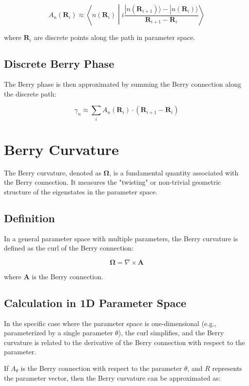 \documentclass{article}
\begin{document}
$$
A_n(\mathbf{R}_i) \approx \left\langle n(\mathbf{R}_i) \middle| i \frac{|n(\mathbf{R}_{i+1})\rangle - |n(\mathbf{R}_i)\rangle}{\mathbf{R}_{i+1} - \mathbf{R}_i} \right\rangle
$$

where $\mathbf{R}_i$ are discrete points along the path in parameter space.

\subsection{Discrete Berry Phase}

The Berry phase is then approximated by summing the Berry connection along the discrete path:

$$
\gamma_n \approx \sum_i A_n(\mathbf{R}_i) \cdot (\mathbf{R}_{i+1} - \mathbf{R}_i)
$$

\section{Berry Curvature}

The Berry curvature, denoted as $\mathbf{\Omega}$, is a fundamental quantity associated with the Berry connection. It measures the "twisting" or non-trivial geometric structure of the eigenstates in the parameter space.

\subsection{Definition}

In a general parameter space with multiple parameters, the Berry curvature is defined as the curl of the Berry connection:

$$
\mathbf{\Omega} = \nabla \times \mathbf{A}
$$

where $\mathbf{A}$ is the Berry connection.

\subsection{Calculation in 1D Parameter Space}

In the specific case where the parameter space is one-dimensional (e.g., parameterized by a single parameter $\theta$), the curl simplifies, and the Berry curvature is related to the derivative of the Berry connection with respect to the parameter.

If $A_\theta$ is the Berry connection with respect to the parameter $\theta$, and $R$ represents the parameter vector, then the Berry curvature can be approximated as:
\end{document}
